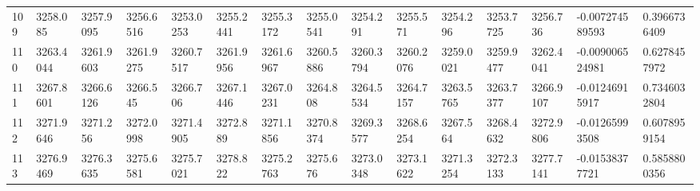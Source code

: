 \begin{landscape}
{\begin{longtable}{@{}lllllllllllllll@{}}
		109                                          & 3258.085                 & 3257.9095                & 3256.6516                & 3253.0253                & 3255.2441                & 3255.3172                & 3255.0541                & 3254.291                 & 3255.571                 & 3254.296                 & 3253.7725                & 3256.736                 & -0.007274589593                                                        & 0.3966736409                                    \\
		110                                          & 3263.4044                & 3261.9603                & 3261.9275                & 3260.7517                & 3261.9956                & 3261.6967                & 3260.5886                & 3260.3794                & 3260.2076                & 3259.0021                & 3259.9477                & 3262.4041                & -0.009006524981                                                        & 0.6278457972                                    \\
		111                                          & 3267.8601                & 3266.6126                & 3266.545                 & 3266.706                 & 3267.1446                & 3267.0231                & 3264.808                 & 3264.5534                & 3264.7157                & 3263.5765                & 3263.7377                & 3266.9107                & -0.01246915917                                                         & 0.7346032804                                    \\
		112                                          & 3271.9646                & 3271.256                 & 3272.0998                & 3271.4905                & 3272.889                 & 3271.1856                & 3270.8374                & 3269.3577                & 3268.6254                & 3267.564                 & 3268.4632                & 3272.9806                & -0.01265993508                                                         & 0.6078959154                                    \\
		113                                          & 3276.9469                & 3276.3635                & 3275.6581                & 3275.7021                & 3278.822                 & 3275.2763                & 3275.676                 & 3273.0348                & 3273.1622                & 3271.3254                & 3272.3133                & 3277.7141                & -0.01538377721                                                         & 0.5858800356                                    \\

\end{longtable}}
\end{landscape}
